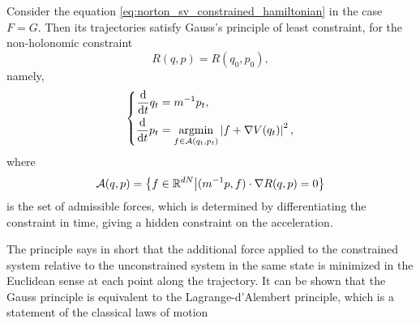 \begin{prop}\label{prop:constrained_dynamics}
    Consider the equation \eqref{eq:norton_sv_constrained_hamiltonian} in the case $F=G$. 
    Then its trajectories satisfy Gauss's principle of least constraint, for the non-holonomic constraint
    \[R(q,p)=R(q_0,p_0),\]
    namely,
    \begin{equation}
        \left\{\begin{aligned}
        \frac{\mathrm{d}}{\mathrm{d}t}q_t&=m^{-1}p_t,\\
        \frac{\mathrm{d}}{\mathrm{d}t}p_t&=\operatorname*{argmin}_{f\in\mathcal A(q_t,p_t)} \left|f+\nabla V(q_t)\right|^2,
        \end{aligned}\right.
    \end{equation}
    where 
    \[\mathcal A(q,p)=\left\{f\in \mathbb{R}^{dN} \middle | (m^{-1}p,f)\cdot\nabla R(q,p)=0\right\}\] 
    is the set of admissible forces, which is determined by differentiating the constraint in time, giving a hidden constraint on the acceleration.
\end{prop}
The principle says in short that the additional force applied to the constrained system relative to the unconstrained system in the same state is minimized in the Euclidean sense at each point along the trajectory.
It can be shown that the Gauss principle is equivalent to the Lagrange-d'Alembert principle, which is a statement of the classical laws of motion
